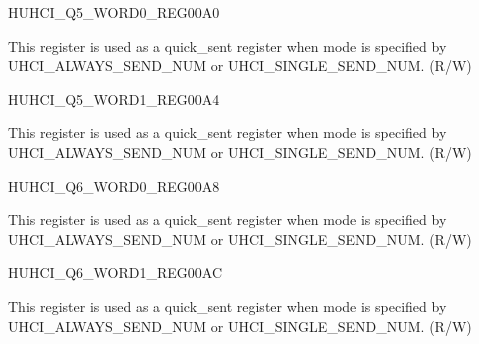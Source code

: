 \begin{register}{H}{UHCI\_Q5\_WORD0\_REG}{\hexprefix{}00A0}\label{regdesc:UHCIQ5WORD0REG}
%
\regnewline%
\begin{regdesc}\begin{reglist}
\label{fielddesc:UHCISENDQ5WORD0}\item [UHCI\_SEND\_Q5\_WORD0] This register is used as a quick\_sent register when mode is specified by UHCI\_ALWAYS\_SEND\_NUM or UHCI\_SINGLE\_SEND\_NUM. (R/W)
\end{reglist}\end{regdesc}
\end{register}


\begin{register}{H}{UHCI\_Q5\_WORD1\_REG}{\hexprefix{}00A4}\label{regdesc:UHCIQ5WORD1REG}
%
\regnewline%
\begin{regdesc}\begin{reglist}
\label{fielddesc:UHCISENDQ5WORD1}\item [UHCI\_SEND\_Q5\_WORD1] This register is used as a quick\_sent register when mode is specified by UHCI\_ALWAYS\_SEND\_NUM or UHCI\_SINGLE\_SEND\_NUM. (R/W)
\end{reglist}\end{regdesc}
\end{register}


\begin{register}{H}{UHCI\_Q6\_WORD0\_REG}{\hexprefix{}00A8}\label{regdesc:UHCIQ6WORD0REG}
%
\regnewline%
\begin{regdesc}\begin{reglist}
\label{fielddesc:UHCISENDQ6WORD0}\item [UHCI\_SEND\_Q6\_WORD0] This register is used as a quick\_sent register when mode is specified by UHCI\_ALWAYS\_SEND\_NUM or UHCI\_SINGLE\_SEND\_NUM. (R/W)
\end{reglist}\end{regdesc}
\end{register}


\begin{register}{H}{UHCI\_Q6\_WORD1\_REG}{\hexprefix{}00AC}\label{regdesc:UHCIQ6WORD1REG}
%
\regnewline%
\begin{regdesc}\begin{reglist}
\label{fielddesc:UHCISENDQ6WORD1}\item [UHCI\_SEND\_Q6\_WORD1] This register is used as a quick\_sent register when mode is specified by UHCI\_ALWAYS\_SEND\_NUM or UHCI\_SINGLE\_SEND\_NUM. (R/W)
\end{reglist}\end{regdesc}
\end{register}


